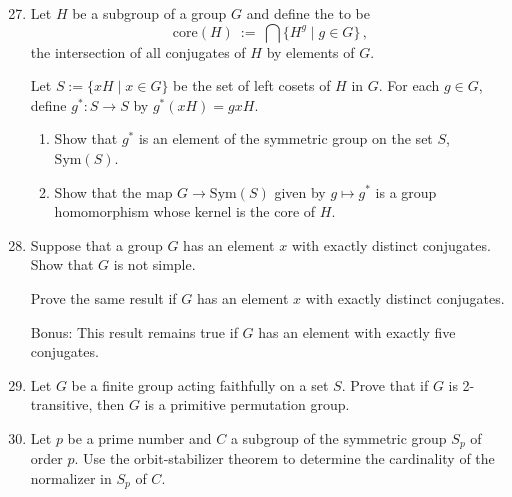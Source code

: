 \documentclass[12pt]{article}
\def\demph#1{\Maroon{{\sl #1}}}
\begin{document}
\begin{enumerate}
\setcounter{enumi}{26}


\item
  Let $H$ be a subgroup of a group $G$ and define the \demph{core of $H$} to be
\[
    \mbox{core}(H)\ :=\ \bigcap\{ H^g \mid g\in G\}\,,
\]
 the intersection of all conjugates of $H$ by elements of $G$.

 Let $S:=\{xH\mid x\in G\}$ be the set of left cosets of $H$ in $G$.
 For each $g\in G$, define $g^*\colon S\to S$ by
 $g^*(xH)=gxH$.
 \begin{enumerate}
  \item Show that $g^*$ is an element of the symmetric group on the set $S$, $\mbox{Sym}(S)$.
  \item Show that the map $G\to\mbox{Sym}(S)$ given by $g\mapsto g^*$ is a group homomorphism
         whose kernel is the core of $H$. 
 \end{enumerate}


\item   Suppose that a group $G$ has an element $x$ with exactly \demph{three} distinct
     conjugates. 
     Show that $G$ is not simple.

     Prove the same result if $G$ has an element $x$ with exactly \demph{four} distinct
     conjugates. 

     Bonus: This result remains true if $G$ has an element with exactly five conjugates.
  
\item Let $G$ be a finite group acting faithfully on a set $S$.
      Prove that if $G$ is 2-transitive, then $G$ is a primitive permutation group.\vspace{-2pt}
  
\item  Let $p$ be a prime number and $C$ a subgroup of the symmetric group $S_p$ of order $p$. 
       Use the orbit-stabilizer theorem to determine the cardinality of the  normalizer in $S_p$ of $C$.
  

\end{enumerate}
\end{document}
